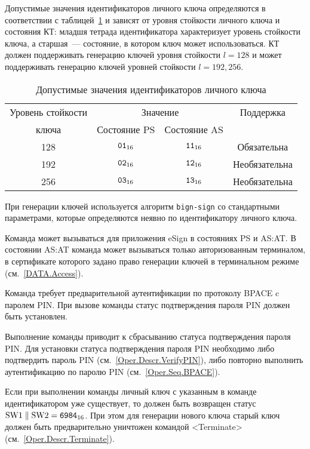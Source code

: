 Допустимые значения идентификаторов личного ключа определяются
в соответствии с таблицей~\ref{Table.Oper.KeyRef} и зависят от
уровня стойкости личного ключа и состояния КТ:
младшя тетрада идентификатора характеризует уровень стойкости ключа,
а старшая~--- состояние, в котором ключ может использоваться.
КТ должен поддерживать генерацию ключей уровня стойкости 
$l=128$ и может поддерживать генерацию ключей 
уровней стойкости $l=192, 256$.

\begin{table}[hbt]
\caption{Допустимые значения идентификаторов личного ключа}
\label{Table.Oper.KeyRef}
\begin{tabular}{|c|c|c|c|}
\hline
Уровень стойкости & \multicolumn{2}{|c|}{Значение } & Поддержка\\
\cline{2-3}
ключа & Состояние PS & Состояние AS & \\
\hline
\hline
128 & $\texttt{01}_{16}$ & $\texttt{11}_{16}$ & Обязательна \\
192 & $\texttt{02}_{16}$ & $\texttt{12}_{16}$ & Необязательна\\
256 & $\texttt{03}_{16}$ & $\texttt{13}_{16}$ & Необязательна\\
\hline
\end{tabular}
\end{table}

При генерации ключей используется алгоритм \texttt{bign-sign}
со стандартными параметрами, которые определяются неявно
по идентификатору личного ключа. 

Команда может вызываться для приложения eSign в состояниях 
PS и AS:AT. В состоянии AS:AT команда может вызываться 
только авторизованным терминалом, в сертификате которого задано право
генерации ключей в терминальном режиме (см.~\ref{DATA.Access}).

Команда требует предварительной аутентификации по 
протоколу BPACE c паролем PIN. При вызове
команды статус подтверждения пароля PIN должен быть 
установлен.

Выполнение команды приводит к сбрасыванию статуса подтверждения пароля PIN.
Для установки статуса подтверждения пароля PIN 
необходимо либо подтвердить пароль PIN (см.~\ref{Oper.Descr.VerifyPIN}), 
либо повторно выполнить аутентификацию по паролю PIN (см.~\ref{Oper.Seq.BPACE}).

Если при выполнении команды личный ключ с указанным в команде идентификатором
уже существует, то должен быть возвращен статус 
$\text{SW1} \parallel \text{SW2} = \texttt{6984}_{16}$. 
При этом для генерации нового ключа старый ключ должен быть предварительно 
уничтожен командой <Terminate> (см.~\ref{Oper.Descr.Terminate}).


